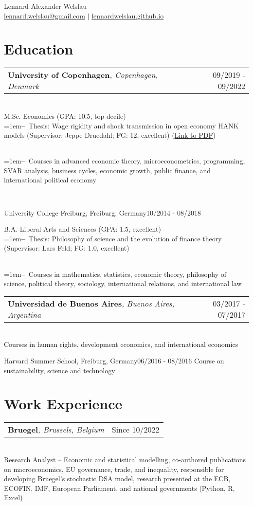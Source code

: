 \documentclass[A4,11pt]{article}
\makeatletter
\newcommand{\myitem}[1]{\hangindent=1em\hangafter=1\textbf{--}~#1\par}
\newcommand{\Subheading}[5]{   
    \begin{tabular*}{0.97\textwidth}[t]{l@{\extracolsep{\fill}}r}
      \textbf{#1}\textit{\small #2} & \small #3 
      \end{tabular*} \\
      \small #4 \\
    \vspace{7pt}
    }
\makeatother
\begin{document}
\begin{center}
    {\Large Lennard Alexander Welslau} \\ 
    \href{mailto:lennard.welslau@gmail.com}{lennard.welslau@gmail.com} $|$ \href{https://lennardwelslau.github.io/}{lennardwelslau.github.io}

\end{center}


\section{Education}
    \Subheading
        {University of Copenhagen}{, Copenhagen, Denmark}{09/2019 - 09/2022}
        {M.Sc. Economics (GPA: 10.5, top decile) \\
        \myitem{Thesis: Wage rigidity and shock transmission in open economy HANK models (Supervisor: Jeppe Druedahl; FG: 12, excellent) (\href{https://lennardwelslau.github.io/research/Welslau_MA_Thesis_2022_Wage_Flexibility_Open_Economy_HANK.pdf}{Link to PDF})}\\
        \myitem{Courses in advanced economic theory, microeconometrics, programming, SVAR analysis, business cycles, economic growth, public finance, and international political economy}
        } 

    \Subheading
        {University College Freiburg}{, Freiburg, Germany}{10/2014 - 08/2018}
        {B.A. Liberal Arts and Sciences (GPA: 1.5, excellent) \\
        \myitem{Thesis: Philosophy of science and the evolution of finance theory (Supervisor: Lars Feld; FG: 1.0, excellent)}\\
        \myitem{Courses in mathematics, statistics, economic theory, philosophy of science, political theory, sociology, international relations, and international law}
        }

    \Subheading
        {Universidad de Buenos Aires}{, Buenos Aires, Argentina}{03/2017 - 07/2017}
        {Courses in human rights, development economics, and international economics}

    \Subheading
        {Harvard Summer School}{, Freiburg, Germany}{06/2016 - 08/2016}
        {Course on sustainability, science and technology}

\section{Work Experience}
    \Subheading
        {Bruegel}{, Brussels, Belgium}{Since 10/2022}
        {Research Analyst -- Economic and statistical modelling, 
        co-authored publications on macroeconomics, EU governance, trade, and inequality,
        responsible for developing Bruegel's stochastic DSA model,
        research presented at the ECB, ECOFIN, IMF, European Parliament, and national governments (Python, R, Excel)}{}
\end{document}
